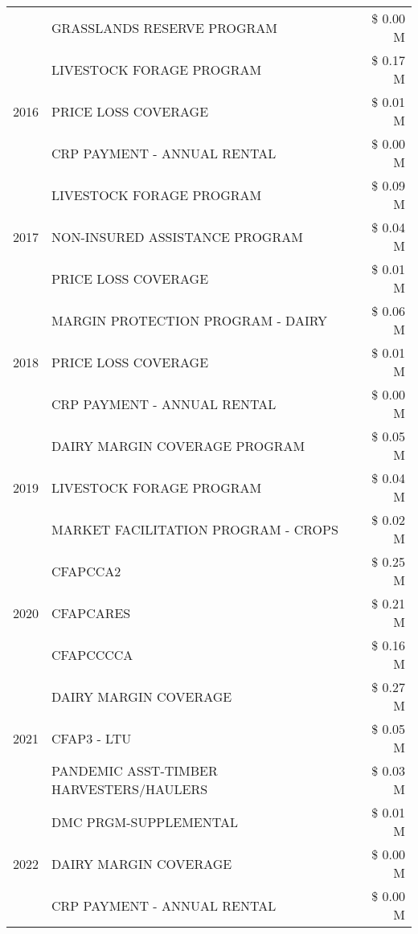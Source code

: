 \begin{tabular}{llr}
 & GRASSLANDS RESERVE PROGRAM & \$ 0.00 M \\
\cline{1-3}
\multirow[t]{3}{*}{2016} & LIVESTOCK FORAGE PROGRAM & \$ 0.17 M \\
 & PRICE LOSS COVERAGE & \$ 0.01 M \\
 & CRP PAYMENT - ANNUAL RENTAL & \$ 0.00 M \\
\cline{1-3}
\multirow[t]{3}{*}{2017} & LIVESTOCK FORAGE PROGRAM & \$ 0.09 M \\
 & NON-INSURED ASSISTANCE PROGRAM & \$ 0.04 M \\
 & PRICE LOSS COVERAGE & \$ 0.01 M \\
\cline{1-3}
\multirow[t]{3}{*}{2018} & MARGIN PROTECTION PROGRAM - DAIRY & \$ 0.06 M \\
 & PRICE LOSS COVERAGE & \$ 0.01 M \\
 & CRP PAYMENT - ANNUAL RENTAL & \$ 0.00 M \\
\cline{1-3}
\multirow[t]{3}{*}{2019} & DAIRY MARGIN COVERAGE PROGRAM & \$ 0.05 M \\
 & LIVESTOCK FORAGE PROGRAM & \$ 0.04 M \\
 & MARKET FACILITATION PROGRAM - CROPS & \$ 0.02 M \\
\cline{1-3}
\multirow[t]{3}{*}{2020} & CFAPCCA2 & \$ 0.25 M \\
 & CFAPCARES & \$ 0.21 M \\
 & CFAPCCCCA & \$ 0.16 M \\
\cline{1-3}
\multirow[t]{3}{*}{2021} & DAIRY MARGIN COVERAGE & \$ 0.27 M \\
 & CFAP3 - LTU & \$ 0.05 M \\
 & PANDEMIC ASST-TIMBER HARVESTERS/HAULERS & \$ 0.03 M \\
\cline{1-3}
\multirow[t]{3}{*}{2022} & DMC PRGM-SUPPLEMENTAL & \$ 0.01 M \\
 & DAIRY MARGIN COVERAGE & \$ 0.00 M \\
 & CRP PAYMENT - ANNUAL RENTAL & \$ 0.00 M \\
\cline{1-3}
\bottomrule
\end{tabular}
